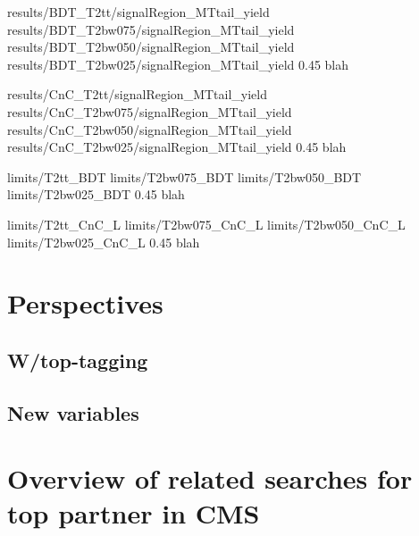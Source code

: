                           {results/BDT_T2tt/signalRegion_MTtail_yield}
                          {results/BDT_T2bw075/signalRegion_MTtail_yield}
                          {results/BDT_T2bw050/signalRegion_MTtail_yield}
                          {results/BDT_T2bw025/signalRegion_MTtail_yield}
                          {0.45}
                          {blah}

                          {results/CnC_T2tt/signalRegion_MTtail_yield}
                          {results/CnC_T2bw075/signalRegion_MTtail_yield}
                          {results/CnC_T2bw050/signalRegion_MTtail_yield}
                          {results/CnC_T2bw025/signalRegion_MTtail_yield}
                          {0.45}
                          {blah}

                          {limits/T2tt_BDT}
                          {limits/T2bw075_BDT}
                          {limits/T2bw050_BDT}
                          {limits/T2bw025_BDT}
                          {0.45}
                          {blah}

                          {limits/T2tt_CnC_L}
                          {limits/T2bw075_CnC_L}
                          {limits/T2bw050_CnC_L}
                          {limits/T2bw025_CnC_L}
                          {0.45}
                          {blah}

    \newpage

    \section{Perspectives \label{sec:analysis_perspective}}
        \loremipsum
        \subsection{W/top-tagging}
        \loremipsum
        \subsection{New variables}
        \loremipsum
    
    \section{Overview of related searches for top partner in CMS \label{sec:analysis_overviewStopSearches}}
        \loremipsum

















